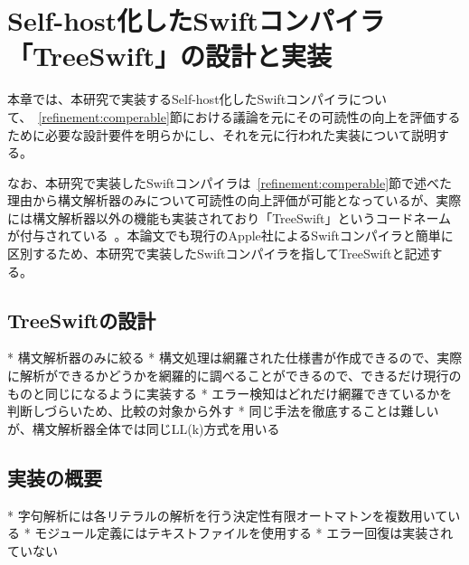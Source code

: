 \chapter{Self-host化したSwiftコンパイラ「TreeSwift」の設計と実装}
\label{implementation}

本章では、本研究で実装するSelf-host化したSwiftコンパイラについて、~\ref{refinement:comperable}節における議論を元にその可読性の向上を評価するために必要な設計要件を明らかにし、それを元に行われた実装について説明する。

なお、本研究で実装したSwiftコンパイラは~\ref{refinement:comperable}節で述べた理由から構文解析器のみについて可読性の向上評価が可能となっているが、実際には構文解析器以外の機能も実装されており「TreeSwift」というコードネームが付与されている~\cite{treeswift}。本論文でも現行のApple社によるSwiftコンパイラと簡単に区別するため、本研究で実装したSwiftコンパイラを指してTreeSwiftと記述する。

\section{TreeSwiftの設計}

* 構文解析器のみに絞る
* 構文処理は網羅された仕様書が作成できるので、実際に解析ができるかどうかを網羅的に調べることができるので、できるだけ現行のものと同じになるように実装する
* エラー検知はどれだけ網羅できているかを判断しづらいため、比較の対象から外す
* 同じ手法を徹底することは難しいが、構文解析器全体では同じLL(k)方式を用いる


\section{実装の概要}

* 字句解析には各リテラルの解析を行う決定性有限オートマトンを複数用いている
* モジュール定義にはテキストファイルを使用する
* エラー回復は実装されていない



